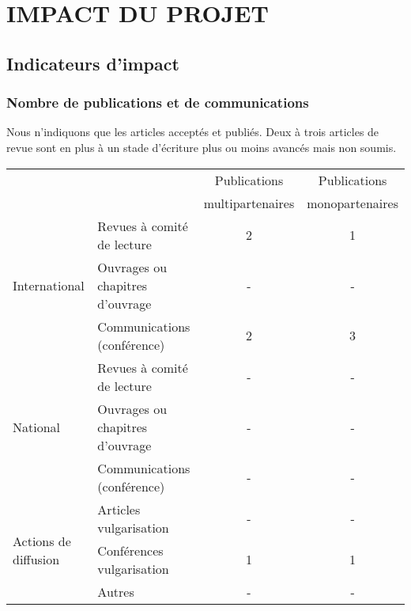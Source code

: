 \section{IMPACT DU PROJET}
\label{sec:impact}



\subsection{Indicateurs d’impact}
\subsubsection*{Nombre de publications et de communications}
Nous n'indiquons que les articles acceptés et publiés. Deux à trois articles de revue sont en plus à un stade d'écriture plus ou moins avancés mais non soumis.

\begin{table}[htbp]
\small
    \centering
    \begin{tabular}{|p{3.25cm}|p{3.25cm}|c|c|}
    \hline
&  & Publications & Publications\\
 & &multipartenaires & monopartenaires \\
\hline

\multirow{3}{*}{International}&Revues à comité de lecture& 2&1\\\cline{2-4}
&Ouvrages ou chapitres d’ouvrage& -&-\\\cline{2-4}
&Communications (conférence)&2&3\\\hline
\multirow{3}{*}{National}&Revues à comité de lecture&-&-\\\cline{2-4}
&Ouvrages ou chapitres d’ouvrage&-&-\\\cline{2-4}
&Communications (conférence)&-&-\\\hline
\multirow{3}{*}{Actions de diffusion}&Articles vulgarisation&-&-\\\cline{2-4}
&Conférences vulgarisation&1&1\\\cline{2-4}
&Autres&-&-\\
\hline
    \end{tabular}
    \label{tab:publis}
\end{table}


